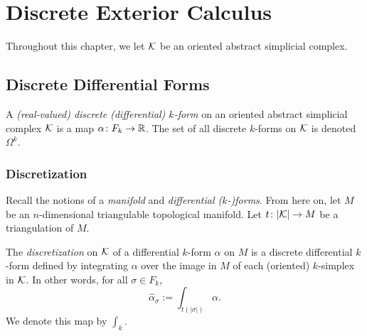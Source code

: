 \chapter{Discrete Exterior Calculus}
\label{chap:discrete_exterior_calculus}

Throughout this chapter, we let $\mathcal{K}$ be an oriented abstract simplicial complex. %

\section{Discrete Differential Forms}

\begin{definition}\label{def:discrete_k-form}
    A \emph{(real-valued) discrete (differential) $k$-form} on an oriented abstract simplicial complex $\mathcal{K}$ is a map $\alpha\colon F_k \to \mathbb{R}$. The set of all discrete $k$-forms on $\mathcal{K}$ is denoted $\Omega^k$.
\end{definition}

\begin{comment} %
\begin{definition}\label{def:discrete_k-form}
    \uses{def:oriented_simplicial_complex}
    A \emph{(real-valued) discrete (differential) $k$-form} on an oriented simplicial complex $\K$ is a map $\alpha\colon F_k \to \R$. The set of all discrete $k$-forms on $\K$ is denoted $\hat{\Omega}^k$.
\end{definition}
\end{comment}

\subsection{Discretization}

Recall the notions of a \emph{manifold} and \emph{differential ($k$-)forms}. %
From here on, let $M$ be an $n$-dimensional triangulable topological manifold. Let $t\colon |\mathcal{K}| \to M$ be a triangulation of $M$.

\begin{definition}\label{def:k-discretization}
    The \emph{discretization} on $\mathcal{K}$ of a differential $k$-form $\alpha$ on $M$ is a discrete differential $k$-form defined by integrating $\alpha$ over the image in $M$ of each (oriented) $k$-simplex in $\mathcal{K}$. In other words, for all $\sigma \in F_k$,
    \[ \hat{\alpha}_\sigma := \int_{t(|\sigma|)} \alpha. \]
    We denote this map by $\int_k$. %
\end{definition}

